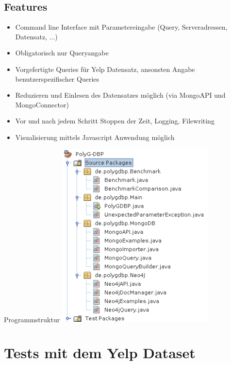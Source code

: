 \documentclass[12pt,usenames,dvipsnames]{beamer}
\begin{document}
\subsection{Features}
\begin{frame}
\begin{itemize}[<+- | alert@+>]
\item Command line Interface mit Parametereingabe (Query, Serveradressen, Datensatz, ...)
\item Obligatorisch nur Queryangabe 
\item Vorgefertigte Queries für Yelp Datensatz, ansonsten Angabe benutzerspezifischer Queries
\item Reduzieren und Einlesen des Datensatzes möglich (via MongoAPI und MongoConnector)
\item Vor und nach jedem Schritt Stoppen der Zeit, Logging, Filewriting
\item Visualisierung mittels Javascript Anwendung möglich
\end{itemize}
\end{frame}
\begin{frame}{Programmstruktur}
\includegraphics[width=0.6\textwidth]{files}

\end{frame}
\section{Tests mit dem Yelp Dataset}
\end{document}
